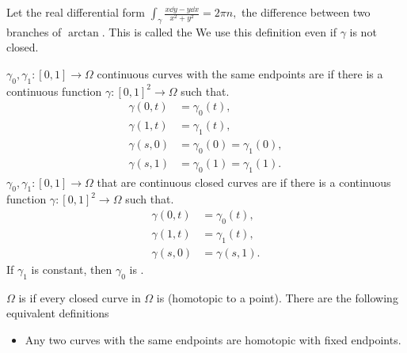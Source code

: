 \documentclass[a4paper,12pt]{article}
\begin{document}
Let the real differential form $\int_\gamma\frac{x\dd y-y\dd x}{x^2+y^2}=2\pi n,$ the difference between two branches of $\arctan.$ This is called the  We use this definition even if $\gamma$ is not closed.

\begin{definition}[Homotopy]
    $\gamma_0,\gamma_1:[0,1]\to\Omega$ continuous curves with the same endpoints are  if there is a continuous function $\gamma:[0,1]^2\to\Omega$ such that.\begin{align}
        \gamma(0,t)&=\gamma_0(t),\\
        \gamma(1,t)&=\gamma_1(t),\\
        \gamma(s,0)&=\gamma_0(0)=\gamma_1(0),\\
        \gamma(s,1)&=\gamma_0(1)=\gamma_1(1).
    \end{align}
    $\gamma_0,\gamma_1:[0,1]\to\Omega$ that are continuous closed curves are  if there is a continuous function $\gamma:[0,1]^2\to\Omega$ such that.\begin{align}
        \gamma(0,t)&=\gamma_0(t),\\
        \gamma(1,t)&=\gamma_1(t),\\
        \gamma(s,0)&=\gamma(s,1).
    \end{align}
    If $\gamma_1$ is constant, then $\gamma_0$ is .
\end{definition}
\begin{definition}
    $\Omega$ is  if every closed curve in $\Omega$ is  (homotopic to a point). There are the following equivalent definitions \begin{itemize}
        \item Any two curves with the same endpoints are homotopic with fixed endpoints.
    \end{itemize}
\end{definition}
\end{document}
